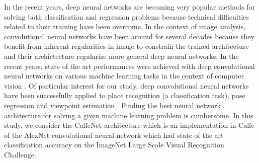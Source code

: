 In the recent years, deep neural networks are becoming very popular methods for solving both classification and regression problems because technical difficulties related to their training have been overcome. In the context of image analysis, convolutional neural networks have been around for several decades because they benefit from inherent regularities in image to constrain the trained architecture and their archictecture regularize more general deep neural networks. In the recent years, state of the art performances were achieved with deep convolutional neural networks on various machine learning tasks in the context of computer vision \cite{NIPS2012_4824,Simonyan14c}. Of particular interest for our study, deep convolutional neural networks have been successfully applied to place recognition \cite{Sunderhauf2015b} (a classification task), pose regression \cite{conf/accv/PfisterSCZ14} and viewpoint estimation \cite{Su2015}. Finding the best neural network architecture for solving a given machine learning problem is cumbersome. In this study, we consider the CaffeNet architecture which is an implementation in Caffe of the AlexNet convolutional neural network\cite{NIPS2012_4824} which had state of the art classification accuracy on the ImageNet Large Scale Visual Recognition Challenge.


